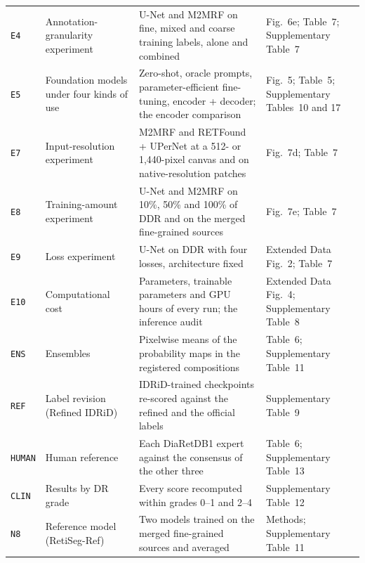 {\begin{longtable}{l p{40mm} p{66mm} p{38mm}}
\texttt{E4} & Annotation-granularity experiment & U-Net and M2MRF on fine, mixed and coarse training labels, alone and combined & Fig.~6e; Table~7; Supplementary Table~7 \\
\texttt{E5} & Foundation models under four kinds of use & Zero-shot, oracle prompts, parameter-efficient fine-tuning, encoder + decoder; the encoder comparison & Fig.~5; Table~5; Supplementary Tables~10 and 17 \\
\texttt{E7} & Input-resolution experiment & M2MRF and RETFound + UPerNet at a 512- or 1,440-pixel canvas and on native-resolution patches & Fig.~7d; Table~7 \\
\texttt{E8} & Training-amount experiment & U-Net and M2MRF on 10\%, 50\% and 100\% of DDR and on the merged fine-grained sources & Fig.~7e; Table~7 \\
\texttt{E9} & Loss experiment & U-Net on DDR with four losses, architecture fixed & Extended Data Fig.~2; Table~7 \\
\texttt{E10} & Computational cost & Parameters, trainable parameters and GPU hours of every run; the inference audit & Extended Data Fig.~4; Supplementary Table~8 \\
\texttt{ENS} & Ensembles & Pixelwise means of the probability maps in the registered compositions & Table~6; Supplementary Table~11 \\
\texttt{REF} & Label revision (Refined IDRiD) & IDRiD-trained checkpoints re-scored against the refined and the official labels & Supplementary Table~9 \\
\texttt{HUMAN} & Human reference & Each DiaRetDB1 expert against the consensus of the other three & Table~6; Supplementary Table~13 \\
\texttt{CLIN} & Results by DR grade & Every score recomputed within grades 0--1 and 2--4 & Supplementary Table~12 \\
\texttt{N8} & Reference model (RetiSeg-Ref) & Two models trained on the merged fine-grained sources and averaged & Methods; Supplementary Table~11 \\
\end{longtable}
}
